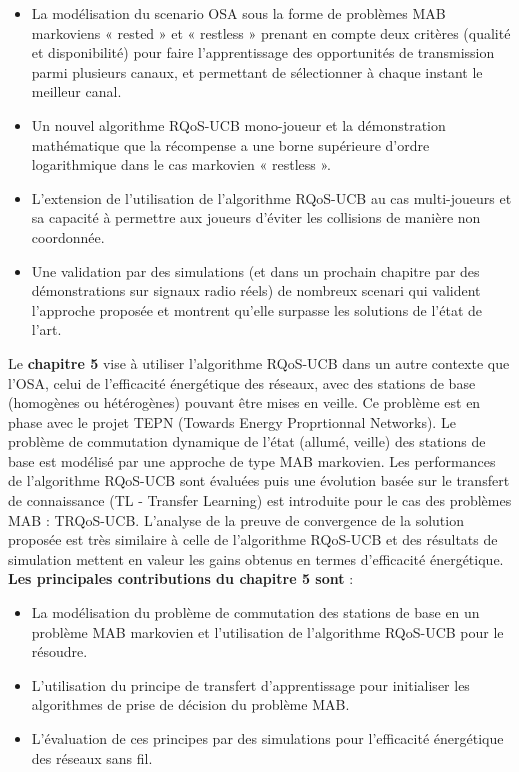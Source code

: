 \begin{itemize}
\item La modélisation du scenario OSA sous la forme de problèmes MAB markoviens « rested » et « restless » prenant en compte deux critères (qualité et disponibilité) pour faire l’apprentissage des opportunités de transmission parmi plusieurs canaux, et permettant de sélectionner à chaque instant le meilleur canal.
\item Un nouvel algorithme RQoS-UCB mono-joueur et la démonstration mathématique que la récompense a une borne supérieure d’ordre logarithmique dans le cas markovien « restless ».
\item L’extension de l’utilisation de l’algorithme RQoS-UCB au cas multi-joueurs et sa capacité à permettre aux joueurs d’éviter les collisions de manière non coordonnée.
\item Une validation par des simulations (et dans un prochain chapitre par des démonstrations sur signaux radio réels) de nombreux scenari qui valident l’approche proposée et montrent qu’elle surpasse les solutions de l’état de l’art.
\end{itemize}

Le \textbf{chapitre 5} vise à utiliser l’algorithme RQoS-UCB dans un autre contexte que l’OSA, celui de l’efficacité énergétique des réseaux, avec des stations de base (homogènes ou hétérogènes) pouvant être mises en veille. Ce problème est en phase avec le projet TEPN (Towards Energy Proprtionnal Networks). Le problème de commutation dynamique de l’état (allumé, veille) des stations de base est modélisé par une approche de type MAB markovien. Les performances de l’algorithme RQoS-UCB sont évaluées puis une évolution basée sur le transfert de connaissance (TL - Transfer Learning) est introduite pour le cas des problèmes MAB : TRQoS-UCB. L’analyse de la preuve de convergence de la solution proposée est très similaire à celle de l'algorithme RQoS-UCB et des résultats de simulation mettent en valeur les gains obtenus en termes d’efficacité énergétique. \textbf{Les principales contributions du chapitre 5 sont} :
\begin{itemize}
\item La modélisation du problème de commutation des stations de base en un problème MAB markovien et l’utilisation de l’algorithme RQoS-UCB pour le résoudre.
\item L’utilisation du principe de transfert d’apprentissage pour initialiser les algorithmes de prise de décision du problème MAB.
\item L’évaluation de ces principes par des simulations pour l’efficacité énergétique des réseaux sans fil.
\end{itemize}

